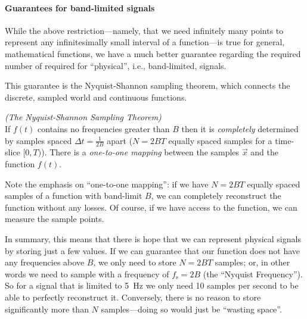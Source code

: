 \documentclass[10pt,letterpaper,oneside]{article}
\begin{document}
\newpage

\paragraph{Guarantees for band-limited signals}
While the above restriction---namely, that we need infinitely many points to represent any infinitesimally small interval of a function---is true for general, mathematical functions, we have a much better guarantee regarding the required number of required for \enquote{physical}, i.e., band-limited, signals.

This guarantee is the Nyquist-Shannon sampling theorem, which connects the discrete, sampled world and continuous functions.
\begin{mdframed}
	\hfill\emph{(The Nyquist-Shannon Sampling Theorem)}\\
	If $f(t)$ contains no frequencies greater than $B$ then it is \emph{completely} determined by samples spaced $\Delta t = \frac{1}{2B}$ apart ($N = 2BT$ equally spaced samples for a time-slice $[0, T)$). There is a \emph{one-to-one mapping} between the samples $\vec x$ and the function $f(t)$.
\end{mdframed}
Note the emphasis on \enquote{one-to-one mapping}: if we have $N = 2BT$ equally spaced samples of a function with band-limit $B$, we can completely reconstruct the function without any losses. Of course, if we have access to the function, we can measure the sample points.

In summary, this means that there is hope that we can represent physical signals by storing just a few values. If we can guarantee that our function does not have any frequencies above $B$, we only need to store $N = 2BT$ samples; or, in other words we need to sample with a frequency of $f_\mathrm{s} = 2B$ (the \enquote{Nyquist Frequency}). So for a signal that is limited to \SI{5}{\hertz} we only need 10 samples per second to be able to perfectly reconstruct it. Conversely, there is no reason to store significantly more than $N$ samples---doing so would just be \enquote{wasting space}.
\end{document}

